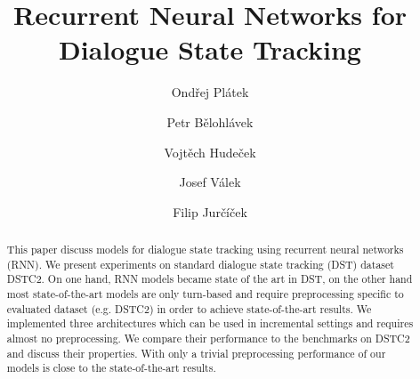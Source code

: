 \documentclass{itatnew}
\def\OP#1{\textcolor{purple}{OP: \textit{#1}}}
\def\PB#1{\textcolor{red}{PB: \textit{#1}}}
\begin{document}
\title{Recurrent Neural Networks for Dialogue State Tracking}

\author{Ondřej Plátek \and Petr Bělohlávek \and Vojtěch Hudeček \and
Josef Válek \and Filip Jurčíček}


\maketitle              %




\begin{abstract}
This paper discuss models for dialogue state tracking using recurrent neural networks (RNN).
We present experiments on standard dialogue state tracking (DST) dataset DSTC2\cite{henderson2014second}.
On one hand, RNN models became state of the art in DST,
on the other hand most state-of-the-art models are only turn-based and require preprocessing specific to evaluated dataset (e.g. DSTC2) in order to achieve state-of-the-art results.
We implemented three architectures which can be used in incremental settings and requires almost no preprocessing.
We compare their performance to the benchmarks on DSTC2 and discuss their properties.
With only a trivial preprocessing performance of our models is close to the state-of-the-art results.
\end{abstract}
%
\end{document}
